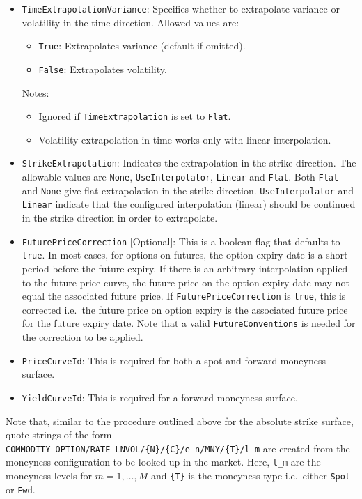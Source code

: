 \begin{itemize}
\item \lstinline!TimeExtrapolationVariance!:
Specifies whether to extrapolate variance or volatility in the time direction. Allowed values are:
  \begin{itemize}
    \item \lstinline!True!: Extrapolates variance (default if omitted).
    \item \lstinline!False!: Extrapolates volatility.
  \end{itemize}
  Notes:
  \begin{itemize}
    \item Ignored if \lstinline!TimeExtrapolation! is set to \lstinline!Flat!.
    \item Volatility extrapolation in time works only with linear interpolation.
  \end{itemize}
\item \lstinline!StrikeExtrapolation!:
Indicates the extrapolation in the strike direction. The allowable values are \lstinline!None!, \lstinline!UseInterpolator!, \lstinline!Linear! and \lstinline!Flat!. Both \lstinline!Flat! and \lstinline!None! give flat extrapolation in the strike direction. \lstinline!UseInterpolator! and \lstinline!Linear! indicate that the configured interpolation (linear) should be continued in the strike direction in order to extrapolate.

\item \lstinline!FuturePriceCorrection! [Optional]:
This is a boolean flag that defaults to \lstinline!true!. In most cases, for options on futures, the option expiry date is a short period before the future expiry. If there is an arbitrary interpolation applied to the future price curve, the future price on the option expiry date may not equal the associated future price. If \lstinline!FuturePriceCorrection! is \lstinline!true!, this is corrected i.e.\ the future price on option expiry is the associated future price for the future expiry date. Note that a valid \lstinline!FutureConventions! is needed for the correction to be applied.

\item \lstinline!PriceCurveId!:
This is required for both a spot and forward moneyness surface.

\item \lstinline!YieldCurveId!:
This is required for a forward moneyness surface.

\end{itemize}

Note that, similar to the procedure outlined above for the absolute strike surface, quote strings of the form \lstinline!COMMODITY_OPTION/RATE_LNVOL/{N}/{C}/e_n/MNY/{T}/l_m! are created from the moneyness configuration to be looked up in the market. Here, \lstinline!l_m! are the moneyness levels for $m=1,\ldots,M$ and \lstinline!{T}! is the moneyness type i.e.\ either \lstinline!Spot! or \lstinline!Fwd!.

